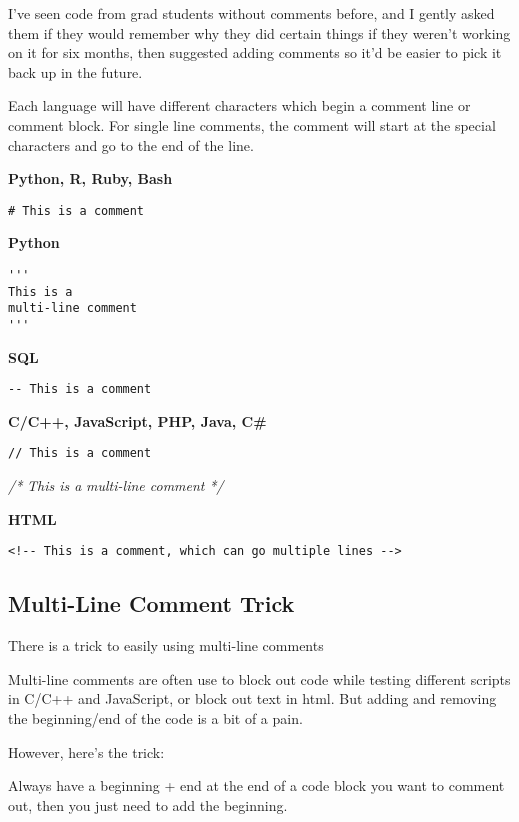 \documentclass[
]{book}
\newenvironment{Shaded}{\begin{snugshade}}{\end{snugshade}}
\newcommand{\CommentTok}[1]{\textcolor[rgb]{0.56,0.35,0.01}{\textit{#1}}}
\begin{document}
I've seen code from grad students without comments before, and I gently asked them if they would remember why they did certain things if they weren't working on it for six months, then suggested adding comments so it'd be easier to pick it back up in the future.

Each language will have different characters which begin a comment line or comment block. For single line comments, the comment will start at the special characters and go to the end of the line.

\textbf{Python, R, Ruby, Bash}

\texttt{\#\ This\ is\ a\ comment}

\textbf{Python}

\begin{verbatim}
'''
This is a 
multi-line comment
'''
\end{verbatim}

\textbf{SQL}

\texttt{-\/-\ This\ is\ a\ comment}

\textbf{C/C++, JavaScript, PHP, Java, C\#}

\texttt{//\ This\ is\ a\ comment}

\begin{Shaded}
\begin{Highlighting}[]
\CommentTok{/* }
\CommentTok{This is a }
\CommentTok{multi{-}line comment }
\CommentTok{*/}
\end{Highlighting}
\end{Shaded}

\textbf{HTML}

\texttt{\textless{}!-\/-\ This\ is\ a\ comment,\ which\ can\ go\ multiple\ lines\ -\/-\textgreater{}}

\subsection{Multi-Line Comment Trick}\label{multi-line-comment-trick}

There is a trick to easily using multi-line comments

Multi-line comments are often use to block out code while testing different scripts in C/C++ and JavaScript, or block out text in html. But adding and removing the beginning/end of the code is a bit of a pain.

However, here's the trick:

Always have a beginning + end at the end of a code block you want to comment out, then you just need to add the beginning.
\end{document}
